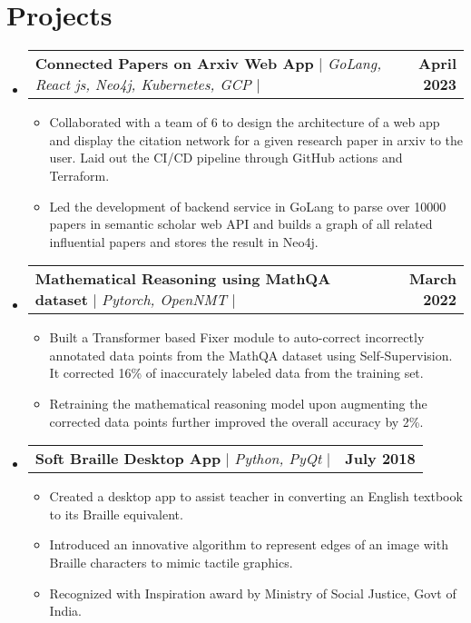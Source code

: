\documentclass[letterpaper,11pt]{article}
\makeatletter
\newcommand{\resumeItem}[1]{
  \item\small{
    {#1 \vspace{-2pt}}
  }
}
\newcommand{\resumeProjectHeading}[2]{
    \item
    \begin{tabular*}{1.001\textwidth}{l@{\extracolsep{\fill}}r}
      \small#1 & \textbf{\small #2}\\
    \end{tabular*}\vspace{-7pt}
}
\newcommand{\resumeSubHeadingListStart}{\begin{itemize}[leftmargin=0.0in, label={}]}
\newcommand{\resumeSubHeadingListEnd}{\end{itemize}}
\newcommand{\resumeItemListStart}{\begin{itemize}}
\newcommand{\resumeItemListEnd}{\end{itemize}\vspace{-5pt}}
\makeatother
\begin{document}
\section{Projects}
    \vspace{-5pt}
    \resumeSubHeadingListStart
      \resumeProjectHeading
          {\textbf{Connected Papers on Arxiv Web App} $|$  \textit{GoLang, React js, Neo4j, Kubernetes, GCP} $|$ \href{https://github.com/ArxivInsanity}{\faGithub}}{April 2023}
          \resumeItemListStart
            \resumeItem{Collaborated with a team of 6 to design the architecture of a web app and display the citation network for a given research paper in arxiv to the user. Laid out the CI/CD pipeline through GitHub actions and Terraform.}
            \resumeItem{Led the development of backend service in GoLang to parse over 10000 papers in semantic scholar web API and builds a graph of all related influential papers and stores the result in Neo4j. }
          \resumeItemListEnd
      \vspace{-16pt}    
      \resumeProjectHeading
          {\textbf{Mathematical Reasoning using MathQA dataset} $|$ \emph{Pytorch, OpenNMT} $|$ \href{https://github.com/anushkumarv/Language_models_explore_numeracy}{\faGithub}}{March 2022}
          \resumeItemListStart
            \resumeItem{Built a Transformer based Fixer module to auto-correct incorrectly annotated data points from the MathQA dataset using Self-Supervision. It corrected 16\% of inaccurately labeled data from the training set. }
            \resumeItem{Retraining the mathematical reasoning model upon augmenting the corrected data points further improved the overall accuracy by 2\%. }
            \resumeItemListEnd
      \vspace{-16pt}  
      \resumeProjectHeading
          {\textbf{Soft Braille Desktop App} $|$ \emph{Python, PyQt} $|$ \href{https://github.com/ACprime96/SoftBraille}{\faGithub}}{July 2018}
          \resumeItemListStart
            \resumeItem{Created a desktop app to assist teacher in converting an English textbook to its Braille equivalent.}
            \resumeItem{Introduced an innovative algorithm to represent edges of an image with Braille characters to mimic tactile graphics.}
            \resumeItem{Recognized with Inspiration award by Ministry of Social Justice, Govt of India. }
          \resumeItemListEnd
    \resumeSubHeadingListEnd
\vspace{-15pt}
\end{document}
